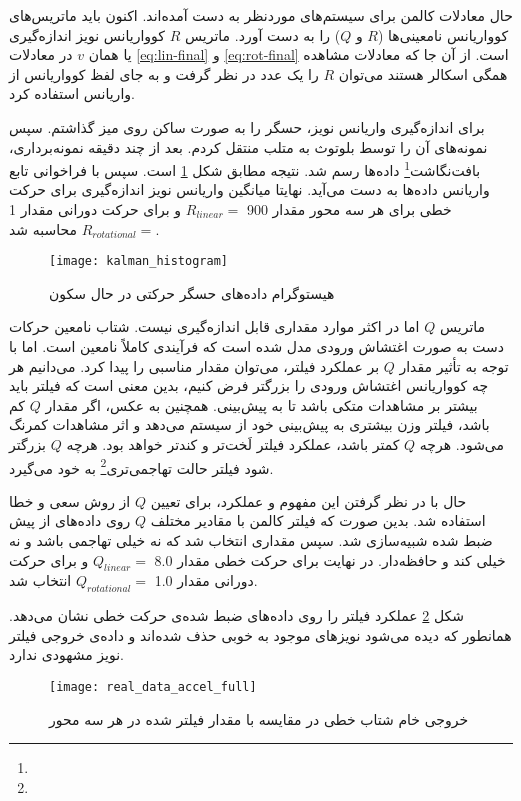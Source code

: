 حال معادلات کالمن برای سیستم‌های موردنظر به دست آمده‌اند. اکنون باید ماتریس‌های کوواریانس نامعینی‌ها ($R$ و $Q$) را به دست آورد. ماتریس $R$ کوواریانس نویز اندازه‌گیری یا همان $v$ در معادلات \ref{eq:lin-final} و \ref{eq:rot-final} است. از آن جا که معادلات مشاهده همگی اسکالر هستند می‌توان $R$ را یک عدد در نظر گرفت و به جای لفظ کوواریانس از واریانس استفاده کرد.

برای اندازه‌گیری واریانس نویز، حسگر را به صورت ساکن روی میز گذاشتم. سپس نمونه‌های آن را توسط بلوتوث به متلب منتقل کردم. بعد از چند دقیقه نمونه‌برداری، بافت‌نگاشت\footnote{} داده‌ها رسم شد. نتیجه مطابق شکل \ref{fig:kalman-histogram} است. سپس با فراخوانی تابع  واریانس داده‌ها به دست می‌آید. نهایتا میانگین واریانس نویز اندازه‌گیری برای حرکت خطی برای هر سه محور مقدار 900 $R_{linear}=$ و برای حرکت دورانی مقدار 1 $R_{rotational}=$ محاسبه شد.

\begin{figure}[h]
	\centering
	\texttt{[image: kalman\_histogram]}
	\caption{هیستوگرام داده‌های حسگر حرکتی در حال سکون}
	\label{fig:kalman-histogram}
\end{figure}

ماتریس $Q$ اما در اکثر موارد مقداری قابل اندازه‌گیری نیست. شتاب نامعین حرکات دست به صورت اغتشاش ورودی مدل شده است که فرآیندی کاملاً نامعین است. اما با توجه به تأثیر مقدار $Q$ بر عملکرد فیلتر، می‌توان مقدار مناسبی را پیدا کرد. می‌دانیم هر چه کوواریانس اغتشاش ورودی را بزرگتر فرض کنیم، بدین معنی است که فیلتر باید بیشتر بر مشاهدات متکی باشد تا به پیش‌بینی. همچنین به عکس، اگر مقدار $Q$ کم باشد، فیلتر وزن بیشتری به پیش‌بینی خود از سیستم می‌دهد و اثر مشاهدات کمرنگ می‌شود. هرچه $Q$ کمتر باشد، عملکرد فیلتر لَخت‌تر و کندتر خواهد بود. هرچه $Q$ بزرگتر شود فیلتر حالت تهاجمی‌تری\footnote{} به خود می‌گیرد.

حال با در نظر گرفتن این مفهوم و عملکرد، برای تعیین $Q$ از روش سعی و خطا استفاده شد. بدین صورت که فیلتر کالمن با مقادیر مختلف $Q$ روی داده‌های از پیش ضبط شده شبیه‌سازی شد. سپس مقداری انتخاب شد که نه خیلی تهاجمی باشد و نه خیلی کند و حافظه‌دار. در نهایت برای حرکت خطی مقدار 8.0 $Q_{linear}=$ و برای حرکت دورانی مقدار 1.0 $Q_{rotational}=$ انتخاب شد.

شکل \ref{fig:kalman-accel-filtered-full} عملکرد فیلتر را روی داده‌های ضبط شده‌ی حرکت خطی نشان می‌دهد. همانطور که دیده می‌شود نویزهای موجود به خوبی حذف شده‌اند و داده‌ی خروجی فیلتر نویز مشهودی ندارد.

\begin{figure}[h]
	\centering
	\texttt{[image: real\_data\_accel\_full]}
	\caption{خروجی خام شتاب خطی در مقایسه با مقدار فیلتر شده در هر سه محور}
	\label{fig:kalman-accel-filtered-full}
\end{figure}

